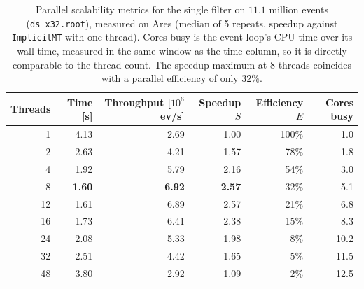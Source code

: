 \begin{table}[htbp]
\centering
\caption{Parallel scalability metrics for the single filter on $11.1$ million events (\texttt{ds\_x32.root}), measured on Ares (median of 5 repeats, speedup against \texttt{ImplicitMT} with one thread). Cores busy is the event loop's CPU time over its wall time, measured in the same window as the time column, so it is directly comparable to the thread count. The speedup maximum at 8 threads coincides with a parallel efficiency of only $32\%$.}
\label{tab:scalability-filter}
\begin{tabular}{rrrrrr}
\toprule
Threads & Time [s] & Throughput [$10^6$ ev/s] & Speedup $S$ & Efficiency $E$ & Cores busy \\
\midrule
 1 & 4.13 & 2.69 & 1.00 & 100\% & 1.0 \\
 2 & 2.63 & 4.21 & 1.57 & 78\% & 1.8 \\
 4 & 1.92 & 5.79 & 2.16 & 54\% & 3.0 \\
 8 & \textbf{1.60} & \textbf{6.92} & \textbf{2.57} & 32\% & 5.1 \\
12 & 1.61 & 6.89 & 2.57 & 21\% & 6.8 \\
16 & 1.73 & 6.41 & 2.38 & 15\% & 8.3 \\
24 & 2.08 & 5.33 & 1.98 & 8\% & 10.2 \\
32 & 2.51 & 4.42 & 1.65 & 5\% & 11.5 \\
48 & 3.80 & 2.92 & 1.09 & 2\% & 12.5 \\
\bottomrule
\end{tabular}
\end{table}

